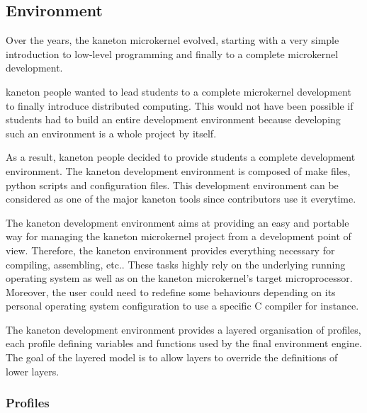%
%
%
%
%
%

%
%

\subsection{Environment}

Over the years, the kaneton microkernel evolved, starting with a very simple
introduction to low-level programming and finally to a complete microkernel
development.

kaneton people wanted to lead students to a complete microkernel development
to finally introduce distributed computing. This would not have been possible
if students had to build an entire development environment because developing
such an environment is a whole project by itself.

As a result, kaneton people decided to provide students a complete development
environment. The kaneton development environment is composed of make files,
python scripts and configuration files. This development environment can be
considered as one of the major kaneton tools since contributors use it
everytime.

The kaneton development environment aims at providing an easy and portable
way for managing the kaneton microkernel project from a development point
of view. Therefore, the kaneton environment provides everything necessary
for compiling, assembling, etc.. These tasks highly rely on the underlying
running operating system as well as on the kaneton microkernel's target
microprocessor. Moreover, the user could need to redefine some behaviours
depending on its personal operating system configuration to use a specific
C compiler for instance.

The kaneton development environment provides a layered organisation of
profiles, each profile defining variables and functions used by the final
environment engine. The goal of the layered model is to allow layers to
override the definitions of lower layers.

%
%

\subsubsection{Profiles}

